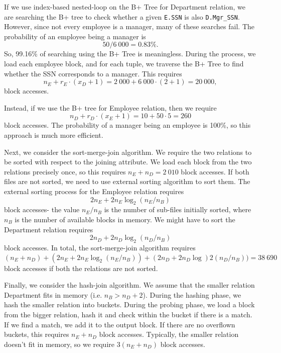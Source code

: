 \documentclass[a4paper, openany]{memoir}
\theoremstyle{definition}
\theoremstyle{plain}
\begin{document}
If we use index-based nested-loop on the B+ Tree for Department relation, we are searching the B+ tree to check whether a given \texttt{E.SSN} is also \texttt{D.Mgr\_SSN}. However, since not every employee is a manager, many of these searches fail. The probability of an employee being a manager is 
\[50/ 6 \ 000 = 0.83\%.\]
So, 99.16\% of searching using the B+ Tree is meaningless. During the process, we load each employee block, and for each tuple, we traverse the B+ Tree to find whether the SSN corresponds to a manager. This requires
\[n_E + r_E \cdot (x_D + 1) = 2 \ 000 + 6 \ 000 \cdot (2 + 1) = 20 \ 000,\]
block accesses. 

Instead, if we use the B+ tree for Employee relation, then we require
\[n_D + r_D \cdot (x_E + 1) = 10 + 50 \cdot 5 = 260\]
block accesses. The probability of a manager being an employee is 100\%, so this approach is much more efficient.

Next, we consider the sort-merge-join algorithm. We require the two relations to be sorted with respect to the joining attribute. We load each block from the two relations precisely once, so this requires $n_E + n_D = 2 \ 010$ block accesses. If both files are not sorted, we need to use external sorting algorithm to sort them. The external sorting process for the Employee relation requires
\[2n_E + 2n_E \log_2 (n_E/n_B)\]
block accesses- the value $n_E/n_B$ is the number of sub-files initially sorted, where $n_B$ is the number of available blocks in memory. We might have to sort the Department relation requires
\[2n_D + 2n_D \log_2 (n_D/n_B)\]
block accesses. In total, the sort-merge-join algorithm requires
\[(n_E + n_D) + (2n_E + 2n_E \log_2 (n_E/n_B)) + (2n_D + 2n_D \log)2 (n_D/n_B)) = 38 \ 690\]
block accesses if both the relations are not sorted. 

Finally, we consider the hash-join algorithm. We assume that the smaller relation Department fits in memory (i.e. $n_B > n_D + 2$). During the hashing phase, we hash the smaller relation into buckets. During the probing phase, we load a block from the bigger relation, hash it and check within the bucket if there is a match. If we find a match, we add it to the output block. If there are no overflown buckets, this requires $n_E + n_D$ block accesses. Typically, the smaller relation doesn't fit in memory, so we require $3(n_E + n_D)$ block accesses.
\end{document}
